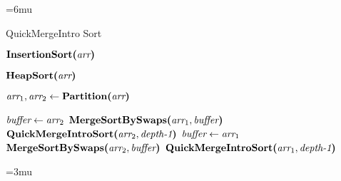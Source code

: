 \begin{algorithm}[H]
	\unboldmath
	\thinmuskip=6mu
	\caption{QuickMergeIntro Sort}
	\begin{algorithmic}[1]
		
		\State
		  \label{line:qmi-insertion-sort}
		\State $\textbf{InsertionSort(}\textit{arr}\textbf{)}$
		
		\State
		  \label{line:qmi-heap-sort}
		\State $\textbf{HeapSort(}\textit{arr}\textbf{)}$
		
		\State
		\Else \label{line:quick-merge-intro-sort}
		\State $\textit{arr}_1, \textit{arr}_2 \gets \textbf{Partition(}\textit{arr}\textbf{)}$ 
		
		\State
		 
		\State $\textit{buffer} \gets \textit{arr}_2$
		\State $\textbf{MergeSortBySwaps(}\textit{arr}_1, \textit{buffer}\textbf{)}$
		\State $\textbf{QuickMergeIntroSort(}\textit{arr}_2, \textit{depth-1}\textbf{)}$
		\Else
		\State $\textit{buffer} \gets \textit{arr}_1$
		\State $\textbf{MergeSortBySwaps(}\textit{arr}_2, \textit{buffer}\textbf{)}$
		\State $\textbf{QuickMergeIntroSort(}\textit{arr}_1, \textit{depth-1}\textbf{)}$
		\EndIf
		\EndIf
		
		\State
		\EndProcedure
	\end{algorithmic}
	\boldmath
	\thinmuskip=3mu
	\label{pseudocode:quick-merge-intro-sort}
\end{algorithm}
